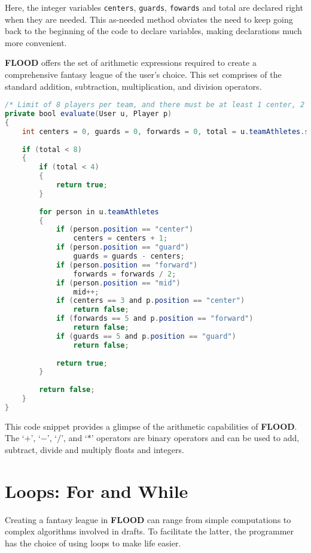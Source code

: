 \documentclass[12pt]{report}
\begin{document}
Here, the integer variables \texttt{centers}, \texttt{guards}, \texttt{fowards} and total are declared right when they are needed. This as-needed method obviates the need to keep going back to the beginning of the code to declare variables, making declarations much more convenient.

\textbf{FLOOD} offers the set of arithmetic expressions required to create a comprehensive fantasy league of the user's choice. This set comprises of the standard addition, subtraction, multiplication, and division operators.

\begin{singlespace}
\begin{lstlisting}[language=Java,label=some-code,caption=Arithmetic expressions]
/* Limit of 8 players per team, and there must be at least 1 center, 2 guards and 2 forwards per team. */
private bool evaluate(User u, Player p)
{
	int centers = 0, guards = 0, forwards = 0, total = u.teamAthletes.size();
	
	if (total < 8)
	{
		if (total < 4)
		{
			return true;
		}
		
		for person in u.teamAthletes
		{
			if (person.position == "center")
				centers = centers + 1;
			if (person.position == "guard")
				guards = guards - centers;
			if (person.position == "forward")
				forwards = forwards / 2;
			if (person.position == "mid")
				mid++;
			if (centers == 3 and p.position == "center")
				return false;
			if (forwards == 5 and p.position == "forward")
				return false;
			if (guards == 5 and p.position == "guard")
				return false;
		
			return true;
		}
	
		return false;
	}
}
\end{lstlisting}
\end{singlespace}

This code snippet provides a glimpse of the arithmetic capabilities of \textbf{FLOOD}. The `$+$', `$-$', `$/$', and `$*$' operators are binary operators and can be used to add, subtract, divide and multiply floats and integers.

\section{Loops: For and While}

Creating a fantasy league in \textbf{FLOOD} can range from simple computations to complex algorithms involved in drafts. To facilitate the latter, the programmer has the choice of using loops to make life easier.
\end{document}
